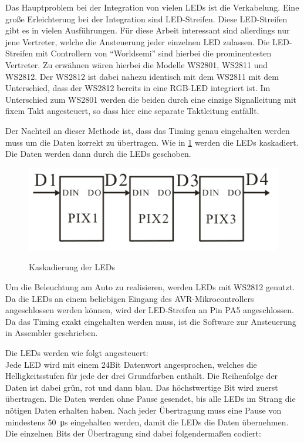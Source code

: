 Das Hauptproblem bei der Integration von vielen LEDs ist die Verkabelung. Eine große Erleichterung bei der Integration sind 
LED-Streifen. Diese LED-Streifen gibt es in vielen Ausführungen. Für diese Arbeit interessant sind allerdings nur jene Vertreter, welche die Ansteuerung
jeder einzelnen LED zulassen. Die LED-Streifen mit Controllern von ``Worldsemi'' sind hierbei die prominentesten Vertreter. Zu erwähnen wären hierbei die Modelle
WS2801, WS2811 und WS2812. Der WS2812 ist dabei nahezu identisch mit dem WS2811 mit dem Unterschied, dass der WS2812 bereits in eine RGB-LED integriert ist.
Im Unterschied zum WS2801 werden die beiden durch eine einzige Signalleitung mit fixem Takt angesteuert, so dass hier eine separate Taktleitung entfällt.

Der Nachteil an dieser Methode ist, dass das Timing genau eingehalten werden muss um die Daten korrekt zu übertragen. Wie in \cref{fig:led_cascade} werden die 
LEDs kaskadiert. Die Daten werden dann durch die LEDs geschoben.

\begin{figure}[H]
\centering
\includegraphics[width=.8\textwidth]{led_cascade.png}\\
\caption{Kaskadierung der LEDs \cite{ds-WS2812}}%
\label{fig:led_cascade}
\end{figure}

Um die Beleuchtung am Auto zu realisieren, werden LEDs mit WS2812 genutzt. Da die LEDs an einem beliebigen
Eingang des AVR-Mikro\-con\-trol\-lers angeschlossen werden können, wird der LED-Streifen an Pin PA5 angeschlossen. Da das Timing 
exakt eingehalten werden muss, ist die Software zur Ansteuerung in Assembler geschrieben.

Die LEDs werden wie folgt angesteuert:\\
Jede LED wird mit einem 24Bit Datenwort angesprochen, welches die Helligkeitsstufen für jede der drei Grundfarben enthält. 
Die Reihenfolge der Daten ist dabei grün, rot und dann blau. Das höchstwertige Bit wird zuerst übertragen.
Die Daten werden ohne Pause gesendet, bis alle LEDs im Strang die nötigen Daten erhalten haben. Nach jeder Übertragung muss eine Pause von mindestens \SI{50}{\micro\second} eingehalten
werden, damit die LEDs die Daten übernehmen. Die einzelnen Bits der Übertragung sind dabei folgendermaßen codiert:

